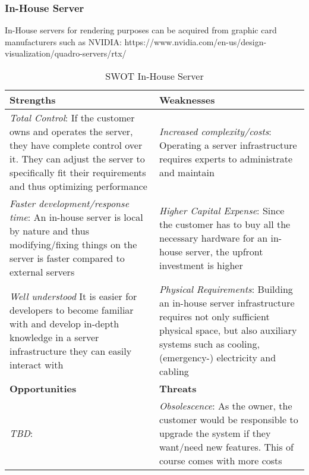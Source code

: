 \subsubsection{In-House Server}
In-House servers for rendering purposes can be acquired from graphic card manufacturers such as NVIDIA: https://www.nvidia.com/en-us/design-visualization/quadro-servers/rtx/

\begin{table}
\caption{SWOT In-House Server}
\begin{center}
\begin{tabular}{ | p{0.5\linewidth} | p{0.5\linewidth} | } 
 \hline
 \textbf{Strengths} & \textbf{Weaknesses}\\ 
\hline
 \textit{Total Control}: If the customer owns and operates the server, they have complete control over it. They can adjust the server to specifically fit their requirements and thus optimizing performance & \textit{Increased complexity/costs}: Operating a server infrastructure requires experts to administrate and maintain \\ 
\textit{Faster development/response time}: An in-house server is local by nature and thus modifying/fixing things on the server is faster compared to external servers & \textit{Higher Capital Expense}: Since the customer has to buy all the necessary hardware for an in-house server, the upfront investment is higher \\
\textit{Well understood} It is easier for developers to become familiar with and develop in-depth knowledge in a server infrastructure they can easily interact with & \textit{Physical Requirements}: Building an in-house server infrastructure requires not only sufficient physical space, but also auxiliary systems such as cooling, (emergency-) electricity and cabling \\
 \hline
 \textbf{Opportunities} & \textbf{Threats}  \\ 
 \hline
\textit{TBD}: & \textit{Obsolescence}: As the owner, the customer would be responsible to upgrade the system if they want/need new features. This of course comes with more costs \\
\hline 
\end{tabular}
\end{center}
\end{table}


